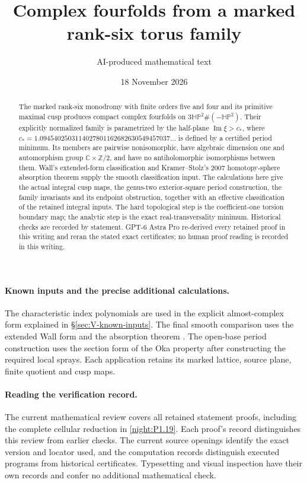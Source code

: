 \title{Complex fourfolds from a marked rank-six torus family}
\author{AI-produced mathematical text}
\date{18 November 2026}
\maketitle

\begin{abstract}
The marked rank-six monodromy with finite orders five and four and its
primitive maximal cusp produces compact complex fourfolds on
$3\mathbb{HP}^2\#(-\mathbb{HP}^2)$. Their explicitly normalized family
is parametrized by the half-plane $\operatorname{Im}\xi>c_*$, where
$c_*=1.0945402503114027801162682630549457037\ldots$ is defined by
a certified period minimum. Its members are pairwise nonisomorphic,
have algebraic dimension one and automorphism group
$\mathbb C\times\mathbb Z/2$, and have no antiholomorphic
isomorphisms between them. Wall's extended-form classification and
Kramer--Stolz's 2007 homotopy-sphere absorption theorem supply the
smooth classification input. The calculations here give the actual
integral cusp maps, the genus-two exterior-square period construction,
the family invariants and its endpoint obstruction, together with an
effective classification of the retained integral inputs. The hard
topological step is the coefficient-one torsion boundary map; the
analytic step is the exact real-transversality minimum. Historical
checks are recorded by statement. GPT-6 Astra Pro re-derived every
retained proof in this writing and reran the stated exact certificates;
no human proof reading is recorded in this writing.
\end{abstract}

\paragraph{Known inputs and the precise additional calculations.}
The characteristic index polynomials are used in the explicit
almost-complex form explained in \S\ref{sec:V-known-inputs}.
The final smooth comparison uses the extended Wall form
\cite[Definition 3.6 and Theorem 3.7(1), pp.~12--14]{IVVWallForm}
and the absorption theorem
\cite[Theorem A, p.~178]{IVVKramerStolz}.
The open-base period construction uses the section form of the Oka
property \cite[Definition 7.7, p.~22; Proposition 7.13(d), p.~24]{IVVOkaOneV5}
after constructing the required local sprays. Each application retains
its marked lattice, source plane, finite quotient and cusp maps.

\paragraph{Reading the verification record.}
The current mathematical review covers all retained statement proofs,
including the complete cellular reduction in \cref{night:P1.19}.
Each proof's record distinguishes this review from earlier checks.
The current source openings identify the exact version and locator
used, and the computation records distinguish executed programs from
historical certificates. Typesetting and visual inspection have their
own records and confer no additional mathematical check.
